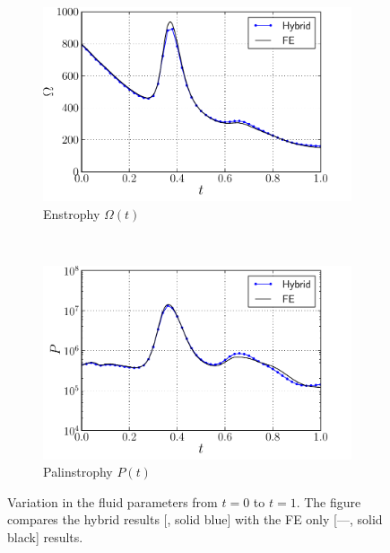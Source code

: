 \begin{figure}[!p]
     \begin{subfigure}[b]{0.49\textwidth}
             \includegraphics[width=\textwidth]{./figures/validation/cbColl/hybrid_doubleMonopole_parameter_Omega.pdf}
             \caption{Enstrophy $\Omega(t)$}
             \label{fig:hybrid_dipole_Enstrophy_comparison}
	 \end{subfigure}
     ~
	 \begin{subfigure}[b]{0.48\textwidth}
	 		\includegraphics[width=\textwidth]{./figures/validation/cbColl/hybrid_doubleMonopole_parameter_P.pdf}
             \caption{Palinstrophy $P(t)$}
			\label{fig:hybrid_dipole_Palinstrophy_comparison}
	 \end{subfigure}     
     
     \caption{Variation in the fluid parameters from $t=0$ to $t=1$. The figure compares the hybrid results [{\color{plotBlue}{---}}, solid blue] with the FE only [---, solid black] results.} %
     \label{fig:hybrid_dipole_comparison}
	\end{figure}

